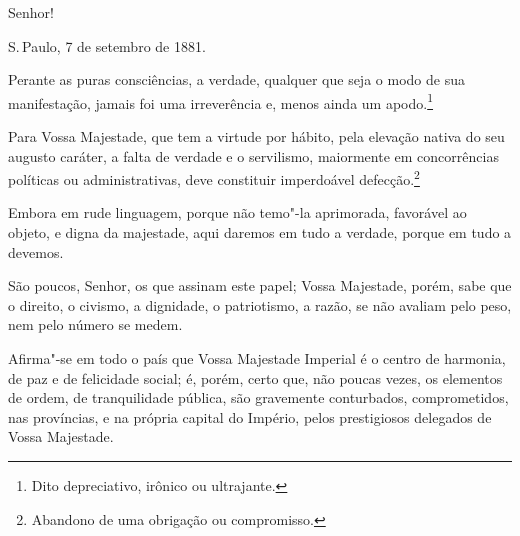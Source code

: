 Senhor!

S.\,Paulo, 7 de setembro de 1881.

Perante as puras consciências, a verdade, qualquer que seja o modo de
sua manifestação, jamais foi uma irreverência e, menos ainda um
apodo.\footnote{Dito depreciativo, irônico ou ultrajante.}

Para Vossa Majestade, que tem a virtude por hábito, pela elevação nativa
do seu augusto caráter, a falta de verdade e o servilismo, maiormente em
concorrências políticas ou administrativas, deve constituir imperdoável
defecção.\footnote{Abandono de uma obrigação ou compromisso.}

Embora em rude linguagem, porque não temo"-la aprimorada, favorável ao
objeto, e digna da majestade, aqui daremos em tudo a verdade, porque em
tudo a devemos.

São poucos, Senhor, os que assinam este papel; Vossa Majestade, porém,
sabe que o direito, o civismo, a dignidade, o patriotismo, a razão, se
não avaliam pelo peso, nem pelo número se medem. \enlargethispage{\baselineskip}


Afirma"-se em todo o país que Vossa Majestade Imperial é o centro de
harmonia, de paz e de felicidade social; é, porém, certo que, não poucas
vezes, os elementos de ordem, de tranquilidade pública, são gravemente
conturbados, comprometidos, nas províncias, e na própria capital do
Império, pelos prestigiosos delegados de Vossa Majestade.

